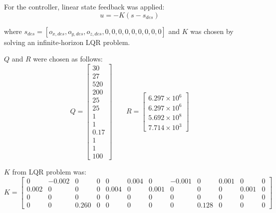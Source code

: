 For the controller, linear state feedback was applied:
\begin{equation}
    u = -K(s-s_{des})
\end{equation}

where $s_{des} = [o_{x,des}, o_{y,des}, o_{z,des}, 0,0,0,0,0,0,0,0,0]$ and $K$ was chosen by solving an infinite-horizon LQR problem.  

$Q$ and $R$ were chosen as follows:
\begin{equation}
    Q = \begin{bmatrix}
    30 \\ 27 \\ 520 \\ 200 \\ 25 \\ 25 \\ 1 \\ 1 \\ 0.17 \\ 1 \\ 1 \\ 100
    \end{bmatrix}
    \quad \quad
    R = \begin{bmatrix}
    6.297\times 10^6 \\ 6.297\times 10^6 \\ 5.692\times 10^8 \\ 7.714\times 10^3 
    \end{bmatrix}
\end{equation}

$K$ from LQR problem was:
\begin{equation*}
K = \left[ {\begin{array}{cccccccccccc}
    0 & -0.002 & 0 & 0 & 0 & 0.004 & 0 & -0.001 & 0 & 0.001 & 0 & 0\\
    0.002 & 0 & 0 & 0 & 0.004 & 0 & 0.001 & 0 & 0 & 0 & 0.001 & 0\\
    0 & 0 & 0 & 0 & 0 & 0 & 0 & 0 & 0 & 0 & 0 & 0\\
    0 & 0 & 0.260 & 0 & 0 & 0 & 0 & 0 & 0.128 & 0 & 0 & 0
    \end{array}}\right]

\end{equation*}

